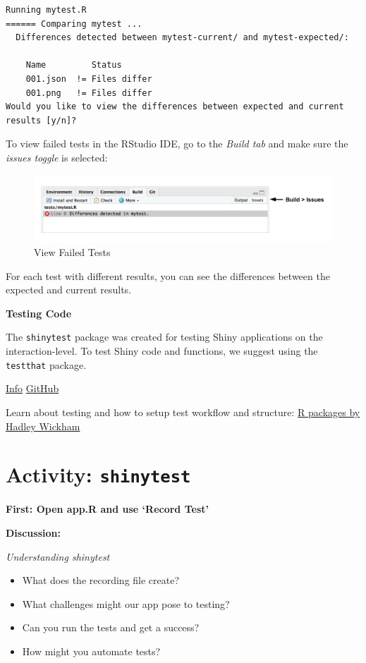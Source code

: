 \documentclass[]{book}
\providecommand{\tightlist}{%
  \setlength{\itemsep}{0pt}\setlength{\parskip}{0pt}}
\theoremstyle{definition}
\theoremstyle{definition}
\theoremstyle{definition}
\theoremstyle{remark}
\begin{document}
\begin{verbatim}
Running mytest.R 
====== Comparing mytest ...
  Differences detected between mytest-current/ and mytest-expected/:

    Name         Status      
    001.json  != Files differ
    001.png   != Files differ
Would you like to view the differences between expected and current results [y/n]? 
\end{verbatim}

To view failed tests in the RStudio IDE, go to the \emph{Build tab} and
make sure the \emph{issues toggle} is selected:

\begin{figure}
\centering
\includegraphics{imgs/testing/failed_tests.png}
\caption{View Failed Tests}
\end{figure}

For each test with different results, you can see the differences
between the expected and current results.

\textbf{Testing Code}

The \texttt{shinytest} package was created for testing Shiny
applications on the interaction-level. To test Shiny code and functions,
we suggest using the \texttt{testthat} package.

\href{http://testthat.r-lib.org/}{Info}
\href{https://github.com/r-lib/testthat}{GitHub}

Learn about testing and how to setup test workflow and structure:
\href{http://r-pkgs.had.co.nz/tests.html}{R packages by Hadley Wickham}

\hypertarget{activity-shinytest}{%
\section{\texorpdfstring{Activity:
\texttt{shinytest}}{Activity: shinytest}}\label{activity-shinytest}}

\textbf{First: Open app.R and use `Record Test'}

\textbf{Discussion:}

\emph{Understanding shinytest}

\begin{itemize}
\tightlist
\item
  What does the recording file create?
\item
  What challenges might our app pose to testing?
\item
  Can you run the tests and get a success?
\item
  How might you automate tests?
\end{itemize}
\end{document}
